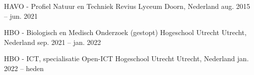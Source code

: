 
\begin{cventries}

  \cventry
    {HAVO - Profiel Natuur en Techniek} %
    {Revius Lyceum} %
    {Doorn, Nederland} %
    {aug. 2015 -- jun. 2021} %
    {}

  \cventry
    {HBO - Biologisch en Medisch Onderzoek (gestopt)} %
    {Hogeschool Utrecht} %
    {Utrecht, Nederland} %
    {sep. 2021 -- jan. 2022} %
    {}

  \cventry
    {HBO - ICT, specialisatie Open-ICT} %
    {Hogeschool Utrecht} %
    {Utrecht, Nederland} %
    {jan. 2022 -- heden} %
    {}

\end{cventries}
